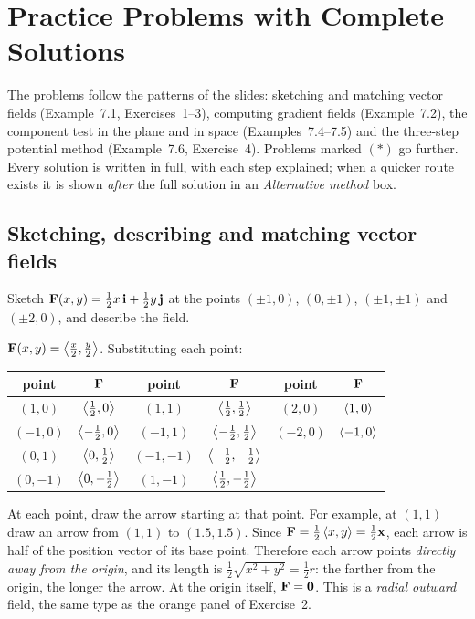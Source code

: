 \section{Practice Problems with Complete Solutions}\label{ch:practice}

The problems follow the patterns of the slides: sketching and matching vector
fields (Example~7.1, Exercises~1--3), computing gradient fields
(Example~7.2), the component test in the plane and in space
(Examples~7.4--7.5) and the three-step potential method (Example~7.6,
Exercise~4). Problems marked $(*)$ go further. Every solution is written in
full, with each step explained; when a quicker route exists it is shown
\emph{after} the full solution in an \emph{Alternative method} box.

\subsection{Sketching, describing and matching vector fields}

\begin{problem}\label{q:sketch}
Sketch $\mathbf{F}(x,y)=\frac12x\,\mathbf{i}+\frac12y\,\mathbf{j}$ at the points $(\pm1,0)$, $(0,\pm1)$,
$(\pm1,\pm1)$ and $(\pm2,0)$, and describe the field.
\end{problem}
\begin{solution}
 $\mathbf{F}(x,y)=\left\langle \frac x2,\frac y2 \right\rangle$. Substituting each point:
\begin{center}
\renewcommand{\arraystretch}{1.25}
\begin{tabular}{cc@{\qquad}cc@{\qquad}cc}
\toprule
point & $\mathbf{F}$ & point & $\mathbf{F}$ & point & $\mathbf{F}$\\
\midrule
$(1,0)$ & $\left\langle \frac12,0 \right\rangle$ & $(1,1)$ & $\left\langle \frac12,\frac12 \right\rangle$ & $(2,0)$ & $\left\langle 1,0 \right\rangle$\\
$(-1,0)$ & $\left\langle -\frac12,0 \right\rangle$ & $(-1,1)$ & $\left\langle -\frac12,\frac12 \right\rangle$ & $(-2,0)$ & $\left\langle -1,0 \right\rangle$\\
$(0,1)$ & $\left\langle 0,\frac12 \right\rangle$ & $(-1,-1)$ & $\left\langle -\frac12,-\frac12 \right\rangle$ & & \\
$(0,-1)$ & $\left\langle 0,-\frac12 \right\rangle$ & $(1,-1)$ & $\left\langle \frac12,-\frac12 \right\rangle$ & & \\
\bottomrule
\end{tabular}
\end{center}
 At each point, draw the arrow starting at that point. For example, at
$(1,1)$ draw an arrow from $(1,1)$ to $(1.5,1.5)$.
 Since $\mathbf{F}=\frac12\left\langle x,y \right\rangle=\frac12\mathbf{x}$, each arrow is half of the position
vector of its base point. Therefore each arrow points \emph{directly away from the origin},
and its length is $\frac12\sqrt{x^2+y^2}=\frac12r$: the farther from the origin, the longer the
arrow. At the origin itself, $\mathbf{F}=\mathbf{0}$. This is a \emph{radial outward} field, the same
type as the orange panel of Exercise~2.
\end{solution}

